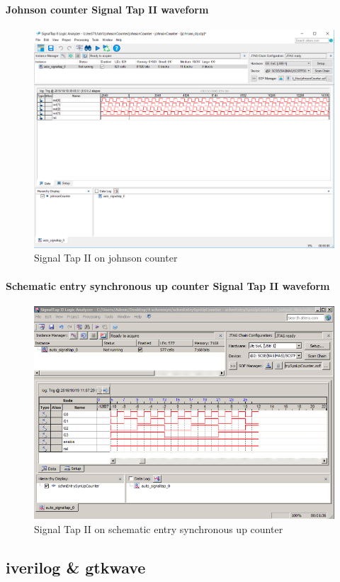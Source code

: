 \documentclass{article}
\begin{document}
	\paragraph{Johnson counter Signal Tap II waveform}
	\begin{figure}[H]
	  \centering
	  \includegraphics[width=0.75\linewidth]{figures/stp/johnson_stp.png}
	  \caption{Signal Tap II on johnson counter}
	  \label{fig:johnson_stp}
	\end{figure}

	\paragraph{Schematic entry synchronous up counter Signal Tap II waveform}
	\begin{figure}[H]
	  \centering
	  \includegraphics[width=0.75\linewidth]{figures/stp/schem_synUp_stp.png}
	  \caption{Signal Tap II on schematic entry synchronous up counter}
	  \label{fig:schem_synUp_stp}
	\end{figure}


\subsection{iverilog \& gtkwave}
\end{document}
